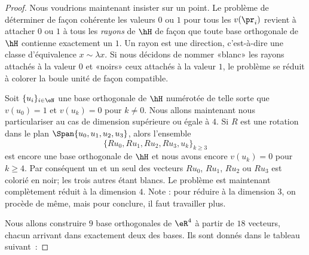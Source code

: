 \begin{proof}
	Nous voudrions maintenant insister sur un point. Le problème de déterminer de façon cohérente les valeurs \( 0\) ou \( 1\) pour tous les \( v(\pr_i)\) revient à attacher \( 0\) ou \( 1\) à tous les \emph{rayons} de \( \hH\) de façon que toute base orthogonale de \( \hH\) contienne exactement un \( 1\). Un rayon est une direction, c'est-à-dire une classe d'équivalence \( x\sim \lambda x\). Si nous décidons de nommer «blanc»  les rayons attachés à la valeur \( 0\) et «noirs»  ceux attachés à la valeur \( 1\), le problème se réduit à colorer la boule unité de façon compatible.

	Soit \( \{ u_i \}_{i\in \eN}\) une base orthogonale de \( \hH\) numérotée de telle sorte que \( v(u_0)=1\) et \( v(u_k)=0\) pour \( k\neq 0\). Nous allons maintenant nous particulariser au cas de dimension supérieure ou égale à \( 4\). Si \( R\) est une rotation dans le plan \( \Span\{ u_0,u_1,u_2,u_3 \}\), alors l'ensemble
	\begin{equation}
		\{ Ru_0,Ru_1,Ru_2,Ru_3,u_k \}_{k\geq 3}
	\end{equation}
	est encore une base orthogonale de \( \hH\) et nous avons encore \( v(u_k)=0\) pour \( k\geq 4\). Par conséquent un et un seul des vecteurs \( Ru_0\), \( Ru_1\), \( Ru_2\) ou \( Ru_3\) est colorié en noir; les trois autres étant blancs. Le problème est maintenant complètement réduit à la dimension \( 4\). Note : pour réduire à la dimension \( 3\), on procède de même, mais pour conclure, il faut travailler plus.

	Nous allons construire \( 9\) base orthogonales de \( \eR^4\) à partir de \( 18\) vecteurs, chacun arrivant dans exactement deux des bases. Ils sont donnés dans le tableau suivant\ :



\end{proof}
